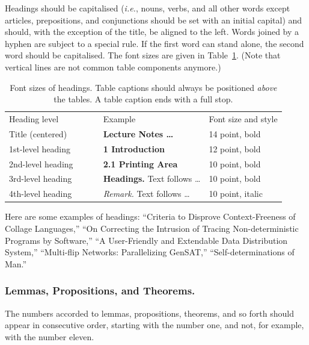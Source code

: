 \documentclass[runningheads]{llncs}
\begin{document}
Headings should be capitalised
({\it i.e.}, nouns, verbs, and all other words
except articles, prepositions, and conjunctions should be set with an
initial capital) and should,
with the exception of the title, be aligned to the left.
Words joined by a hyphen are subject to a special rule. If the first
word can stand alone, the second word should be capitalised.
The font sizes
are given in Table~\ref{table:headings}. (Note that vertical lines
are not common table components anymore.)
%
\setlength{\tabcolsep}{4pt}
\begin{table}
\begin{center}
\caption{
Font sizes of headings. Table captions should always be
positioned {\it above} the tables. A table
caption ends with a full stop.
}
\label{table:headings}
\begin{tabular}{lll}
\hline\noalign{\smallskip}
Heading level $\qquad\qquad$& Example & Font size and style\\
\noalign{\smallskip}
\hline
\noalign{\smallskip}
Title (centered)  & {\Large \bf Lecture Notes \dots} $\qquad$& 14 point, bold\\
1st-level heading & {\large \bf 1 Introduction} & 12 point, bold\\
2nd-level heading & {\bf 2.1 Printing Area} & 10 point, bold\\
3rd-level heading & {\bf Headings.} Text follows \dots & 10 point, bold
\\
4th-level heading & {\it Remark.} Text follows \dots & 10 point,
italic\\
\hline
\end{tabular}
\end{center}
\end{table}
\setlength{\tabcolsep}{1.4pt}

Here are
some examples of headings: ``Criteria to Disprove Context-Freeness of
Collage Languages,'' ``On Correcting the Intrusion of Tracing
Non-deterministic Programs by Software,'' ``A User-Friendly and
Extendable Data Distribution System,'' ``Multi-flip Networks:
Parallelizing GenSAT,'' ``Self-determinations of Man.''

\subsubsection{Lemmas, Propositions, and Theorems.}

The numbers accorded to lemmas, propositions, theorems, and so forth should
appear in consecutive order, starting with the number one, and not, for
example, with the number eleven.
\end{document}
